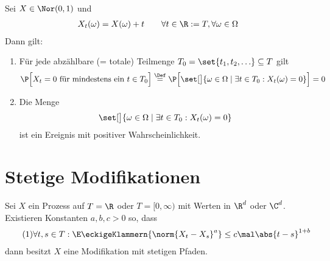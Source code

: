 \begin{aufgabenr}\label{aufg:18}\enter
	Sei $X\in\Nor(0,1)$ und
	\begin{align*}
		X_t(\omega)=X(\omega)+t\qquad\forall t\in \R:=T,\forall\omega\in\Omega
	\end{align*}
	Dann gilt:
	\begin{enumerate}[label=(\alph*)]
		\item Für jede abzählbare (= totale) Teilmenge $T_0=\set{t_1,t_2,\ldots}\subseteq T$ gilt
		\begin{align*}
			\P\Big[X_t=0\text{ für mindestens ein }t\in T_0\Big]
			\overset{\Def}{=}
			\P\Big[\set[\big]{\omega\in\Omega\mid\exists t\in T_0:X_t(\omega)=0}\Big]=0
		\end{align*}
		\item Die Menge
		\begin{align*}
			\set[\big]{\omega\in\Omega\mid\exists t\in T_0:X_t(\omega)=0}
		\end{align*}
		ist ein Ereignis mit positiver Wahrscheinlichkeit.
	\end{enumerate}
\end{aufgabenr}

\section{Stetige Modifikationen} %

\begin{satz}[Kolmogorov]\label{satz2.2.1Kolmo}\enter
	Sei $X$ ein Prozess auf $T=\R$ oder $T=[0,\infty)$ mit Werten in $\R^d$ oder $\C^d$.
	Existieren Konstanten $a,b,c>0$ so, dass
	\begin{align}\label{eq:satz2.1Kolmo_1}\tag{1}
		\forall t,s\in T:\E\eckigeKlammern{\norm{X_t-X_s}^a}\leq c\mal\abs{t-s}^{1+b}
	\end{align}
	dann besitzt $X$ eine Modifikation mit stetigen Pfaden.
\end{satz}

